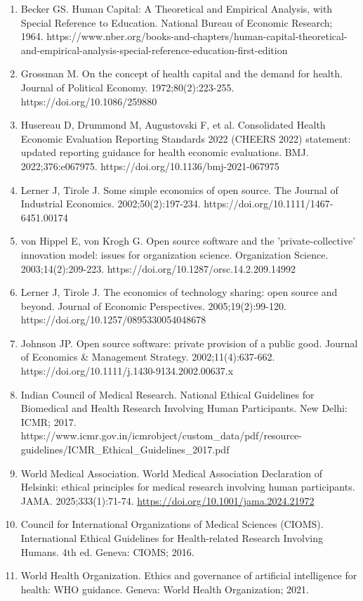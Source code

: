 \documentclass[11pt,a4paper]{article}
\begin{document}
\begin{enumerate}[leftmargin=*]
\item Becker GS. Human Capital: A Theoretical and Empirical Analysis, with Special Reference to Education. National Bureau of Economic Research; 1964. https://www.nber.org/books-and-chapters/human-capital-theoretical-and-empirical-analysis-special-reference-education-first-edition
\item Grossman M. On the concept of health capital and the demand for health. Journal of Political Economy. 1972;80(2):223-255. https://doi.org/10.1086/259880
\item Husereau D, Drummond M, Augustovski F, et al. Consolidated Health Economic Evaluation Reporting Standards 2022 (CHEERS 2022) statement: updated reporting guidance for health economic evaluations. BMJ. 2022;376:e067975. https://doi.org/10.1136/bmj-2021-067975
\item Lerner J, Tirole J. Some simple economics of open source. The Journal of Industrial Economics. 2002;50(2):197-234. https://doi.org/10.1111/1467-6451.00174
\item von Hippel E, von Krogh G. Open source software and the 'private-collective' innovation model: issues for organization science. Organization Science. 2003;14(2):209-223. https://doi.org/10.1287/orsc.14.2.209.14992
\item Lerner J, Tirole J. The economics of technology sharing: open source and beyond. Journal of Economic Perspectives. 2005;19(2):99-120. https://doi.org/10.1257/0895330054048678
\item Johnson JP. Open source software: private provision of a public good. Journal of Economics \& Management Strategy. 2002;11(4):637-662. https://doi.org/10.1111/j.1430-9134.2002.00637.x
\item Indian Council of Medical Research. National Ethical Guidelines for Biomedical and Health Research Involving Human Participants. New Delhi: ICMR; 2017. https://www.icmr.gov.in/icmrobject/custom\_data/pdf/resource-guidelines/ICMR\_Ethical\_Guidelines\_2017.pdf
\item World Medical Association. World Medical Association Declaration of Helsinki: ethical principles for medical research involving human participants. JAMA. 2025;333(1):71-74. \url{https://doi.org/10.1001/jama.2024.21972}
\item Council for International Organizations of Medical Sciences (CIOMS). International Ethical Guidelines for Health-related Research Involving Humans. 4th ed. Geneva: CIOMS; 2016.
\item World Health Organization. Ethics and governance of artificial intelligence for health: WHO guidance. Geneva: World Health Organization; 2021.

\end{enumerate}
\end{document}
